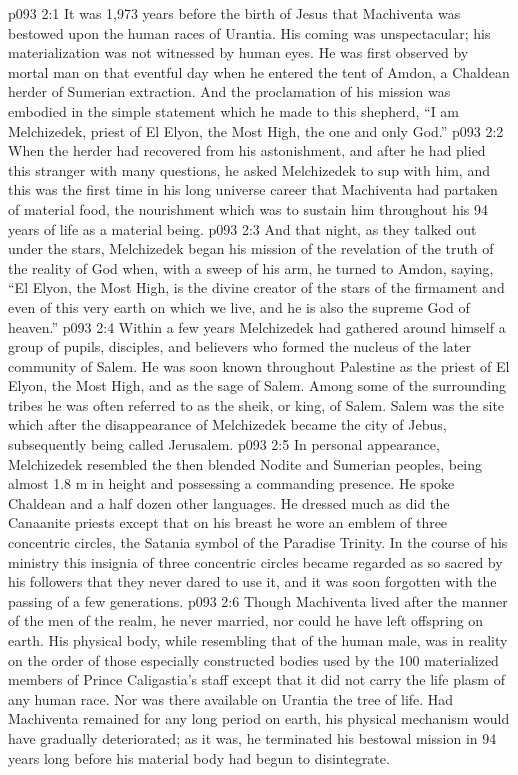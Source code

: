 \vs p093 2:1 It was 1,973 years before the birth of Jesus that Machiventa was bestowed upon the human races of Urantia. His coming was unspectacular; his materialization was not witnessed by human eyes. He was first observed by mortal man on that eventful day when he entered the tent of Amdon, a Chaldean herder of Sumerian extraction. And the proclamation of his mission was embodied in the simple statement which he made to this shepherd, “I am Melchizedek, priest of El Elyon, the Most High, the one and only God.”
\vs p093 2:2 When the herder had recovered from his astonishment, and after he had plied this stranger with many questions, he asked Melchizedek to sup with him, and this was the first time in his long universe career that Machiventa had partaken of material food, the nourishment which was to sustain him throughout his 94 years of life as a material being.
\vs p093 2:3 And that night, as they talked out under the stars, Melchizedek began his mission of the revelation of the truth of the reality of God when, with a sweep of his arm, he turned to Amdon, saying, “El Elyon, the Most High, is the divine creator of the stars of the firmament and even of this very earth on which we live, and he is also the supreme God of heaven.”
\vs p093 2:4 \pc Within a few years Melchizedek had gathered around himself a group of pupils, disciples, and believers who formed the nucleus of the later community of Salem. He was soon known throughout Palestine as the priest of El Elyon, the Most High, and as the sage of Salem. Among some of the surrounding tribes he was often referred to as the sheik, or king, of Salem. Salem was the site which after the disappearance of Melchizedek became the city of Jebus, subsequently being called Jerusalem.
\vs p093 2:5 \pc In personal appearance, Melchizedek resembled the then blended Nodite and Sumerian peoples, being almost 1.8 m in height and possessing a commanding presence. He spoke Chaldean and a half dozen other languages. He dressed much as did the Canaanite priests except that on his breast he wore an emblem of three concentric circles, the Satania symbol of the Paradise Trinity. In the course of his ministry this insignia of three concentric circles became regarded as so sacred by his followers that they never dared to use it, and it was soon forgotten with the passing of a few generations.
\vs p093 2:6 Though Machiventa lived after the manner of the men of the realm, he never married, nor could he have left offspring on earth. His physical body, while resembling that of the human male, was in reality on the order of those especially constructed bodies used by the 100 materialized members of Prince Caligastia’s staff except that it did not carry the life plasm of any human race. Nor was there available on Urantia the tree of life. Had Machiventa remained for any long period on earth, his physical mechanism would have gradually deteriorated; as it was, he terminated his bestowal mission in 94 years long before his material body had begun to disintegrate.

